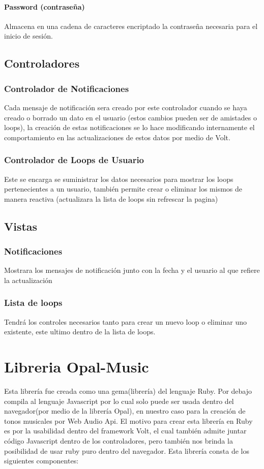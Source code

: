 \paragraph{Password (contraseña)}
Almacena en una cadena de caracteres encriptado la contraseña necesaria para
el inicio de sesión.

\subsection{Controladores}
\subsubsection{Controlador de Notificaciones}
Cada mensaje de notificación sera creado por este controlador cuando se haya creado
o borrado un dato en el usuario (estos cambios pueden ser de amistades o loops),
la creación de estas notificaciones se lo hace modificando internamente el comportamiento en las
actualizaciones de estos datos por medio de Volt.

\subsubsection{Controlador de Loops de Usuario}
Este se encarga se suministrar los datos necesarios para mostrar los
loops pertenecientes a un usuario, también permite crear o eliminar los
mismos de manera reactiva (actualizara la lista de loops sin refrescar
la pagina)

\subsection{Vistas}
\subsubsection{Notificaciones}
Mostrara los mensajes de notificación junto con la fecha y el usuario al
que refiere la actualización
\subsubsection{Lista de loops}
Tendrá los controles necesarios tanto para crear un nuevo loop o
eliminar uno existente, este ultimo dentro de la lista de loops.

\section{Libreria Opal-Music}
Esta librería fue creada como una gema(librería) del lenguaje Ruby. Por
debajo compila al lenguaje Javascript por lo cual solo puede ser usada
dentro del navegador(por medio de la librería Opal), en nuestro caso
para la creación de tonos musicales por Web Audio Api. El motivo para
crear esta librería en Ruby es por la usabilidad dentro del framework
Volt, el cual también admite juntar código Javascript dentro de los
controladores, pero también nos brinda la posibilidad de usar ruby puro
dentro del navegador. Esta librería consta de los siguientes componentes:


